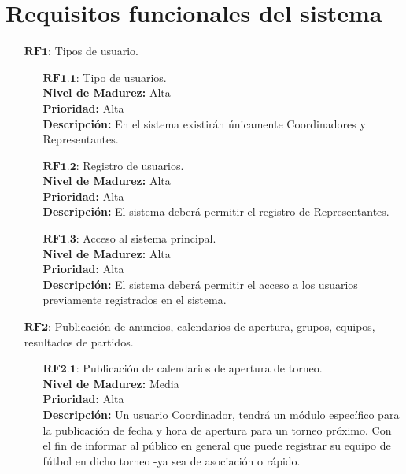 \section{Requisitos funcionales del sistema}

\begin{enumerate}
	\item[$\textbf{RF1:}$] Tipos de usuario.
		\begin{enumerate}
			\item[$\textbf{RF1.1:}$] Tipo de usuarios. \\
				\tab \textbf{Nivel de Madurez:} Alta \\
				\tab \textbf{Prioridad:} Alta  \\
				\tab \textbf{Descripción:} En el sistema existirán únicamente Coordinadores y Representantes. \\
			\item[$\textbf{RF1.2:}$] Registro de usuarios. \\
				\tab \textbf{Nivel de Madurez:} Alta \\
				\tab \textbf{Prioridad:} Alta  \\
				\tab \textbf{Descripción:} El sistema deberá permitir el registro de Representantes. \\
			\item[$\textbf{RF1.3:}$] Acceso al sistema principal. \\
				\tab \textbf{Nivel de Madurez:} Alta \\
				\tab \textbf{Prioridad:} Alta \\
				\tab \textbf{Descripción:} El sistema deberá permitir el acceso a los usuarios previamente registrados en el sistema.
		\end{enumerate}
	\item[$\textbf{RF2:}$] Publicación de anuncios, calendarios de apertura, grupos, equipos, resultados de partidos.
		\begin{enumerate}
			\item[$\textbf{RF2.1:}$] Publicación de calendarios de apertura de torneo.\\
				\tab \textbf{Nivel de Madurez:} Media \\
				\tab \textbf{Prioridad:} Alta  \\
				\tab \textbf{Descripción:} Un usuario Coordinador, tendrá un módulo específico para la publicación de fecha y hora de apertura para un torneo próximo. Con el fin de informar al público en general que puede registrar su equipo de fútbol en dicho torneo -ya sea de asociación o rápido. \\

\end{enumerate}
\end{enumerate}
